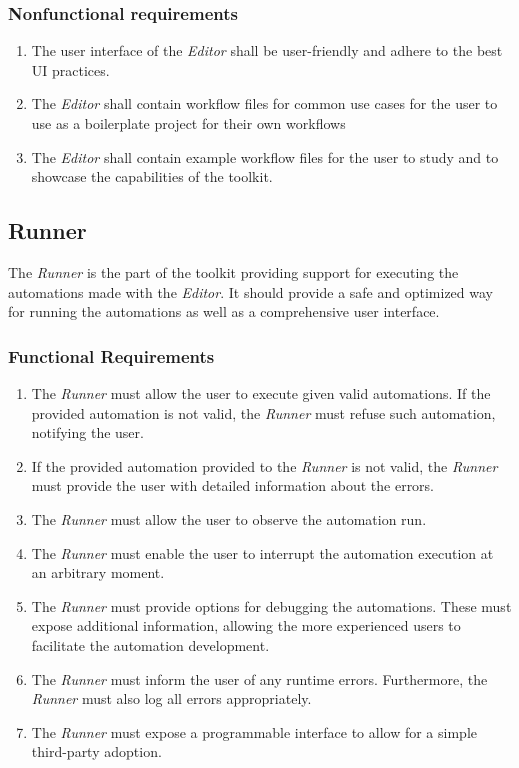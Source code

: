 \subsubsection{Nonfunctional requirements}

\begin{enumerate}[label=\thesubsection.2.\arabic*]
    \item The user interface of the \textit{Editor} shall be user-friendly and adhere to the best \ac{UI} practices.
    \item The \textit{Editor} shall contain workflow files for common use cases for the user to use as a boilerplate project for their own workflows
    \item The \textit{Editor} shall contain example workflow files for the user to study and to showcase the capabilities of the toolkit.
\end{enumerate}

\clearpage
\subsection{Runner}

The \textit{Runner} is the part of the toolkit providing support for executing the automations made with the \textit{Editor}.
It should provide a safe and optimized way for running the automations as well as a comprehensive user interface.

\subsubsection{Functional Requirements}

\begin{enumerate}[label=\thesubsection.1.\arabic*]
    \item The \textit{Runner} must allow the user to execute given valid automations. 
    If the provided automation is not valid, the \textit{Runner} must refuse such automation, notifying the user.
    \item If the provided automation provided to the \textit{Runner} is not valid, 
    the \textit{Runner} must provide the user with detailed information about the errors.
    \item The \textit{Runner} must allow the user to observe the automation run.
    \item The \textit{Runner} must enable the user to interrupt the automation execution at an arbitrary moment.
    \item The \textit{Runner} must provide options for debugging the automations. 
    These must expose additional information, allowing the more experienced users to facilitate the automation development.
    \item The \textit{Runner} must inform the user of any runtime errors. 
    Furthermore, the \textit{Runner} must also log all errors appropriately.
    \item The \textit{Runner} must expose a programmable interface to allow for a simple third-party adoption.
\end{enumerate}

